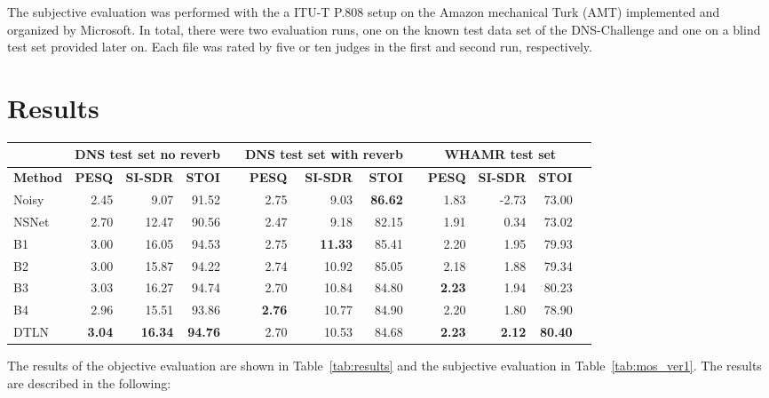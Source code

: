 \documentclass[a4paper]{article}
\begin{document}
The subjective evaluation was performed with the a ITU-T P.808 setup on the Amazon mechanical Turk (AMT) implemented and organized by Microsoft. In total, there were two evaluation runs, one on the known test data set of the DNS-Challenge and one on a blind test set provided later on. Each file was rated by five or ten judges in the first and second run, respectively. 
\section{Results}
\begin{table*}[t]
    \caption{Results in terms of PESQ [MOS], SI-SDR [dB] and STOI [\%] of the non reverberant test set, the reverberant test set of the DNS challenge and the reverberant single mix test set of the WHAMR corpus.}
  \centering
  \begin{tabular}{l r r r r r r r r r r r r}
  \toprule
  &  \multicolumn{3}{c}{\textbf{DNS test set no reverb}} & & \multicolumn{3}{c}{\textbf{DNS test set with reverb}} &  & \multicolumn{3}{c}{\textbf{WHAMR test set}} 
        \\
    \midrule
    \textbf{Method} & \textbf{PESQ} &  \textbf{SI-SDR}  & \textbf{STOI} &
    & \textbf{PESQ} & \textbf{SI-SDR}  & \textbf{STOI} &
    & \textbf{PESQ} & \textbf{SI-SDR}  & \textbf{STOI}\\
    \midrule
     Noisy &  2.45 & 9.07 & 91.52 &  & 2.75 & 9.03 & \textbf{86.62} & & 1.83 &	-2.73	&	73.00 \\
     \midrule
     NSNet  & 2.70 & 12.47 & 90.56 & & 2.47 & 9.18 & 82.15 & & 1.91	&	0.34	&	73.02 \\
     B1     & 3.00 & 16.05 & 94.53 & & 2.75 & \textbf{11.33} & 85.41 & & 2.20	&	1.95	&	79.93 \\
     B2     & 3.00 & 15.87 & 94.22 & & 2.74 & 10.92 & 85.05 & & 2.18 &	1.88	&	79.34 \\
     B3     & 3.03 & 16.27 & 94.74 & & 2.70 & 10.84 & 84.80 & & \textbf{2.23}	 &	1.94	&	80.23	 \\
     B4     & 2.96 & 15.51 & 93.86 & & \textbf{2.76} & 10.77 & 84.90 & & 2.20	& 1.80    &	78.90	 \\
     \midrule
     DTLN   & \textbf{3.04} & \textbf{16.34} & \textbf{94.76} & & 2.70 & 10.53 & 84.68 & & \textbf{2.23}	&	\textbf{2.12}	&	\textbf{80.40}	\\
     \bottomrule
  \end{tabular}
  \label{tab:results}
\end{table*}
The results of the objective evaluation are shown in Table~\ref{tab:results} and the subjective evaluation in Table~\ref{tab:mos_ver1}. The results are described in the following:
\end{document}
